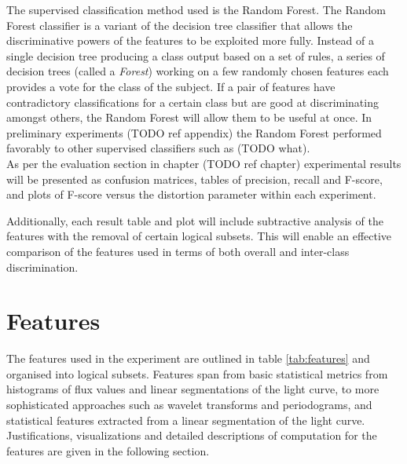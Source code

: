 		The supervised classification method used is the Random Forest. The Random Forest classifier is a variant of the decision tree classifier that allows the discriminative powers of the features to be exploited more fully. Instead of a single decision tree producing a class output based on a set of rules, a series of decision trees (called a \emph{Forest}) working on a few randomly chosen features each provides a vote for the class of the subject. If a pair of features have contradictory classifications for a certain class but are good at discriminating amongst others, the Random Forest will allow them to be useful at once. In preliminary experiments (TODO ref appendix) the Random Forest performed favorably to other supervised classifiers such as (TODO what).\\ %

	As per the evaluation section in chapter (TODO ref chapter) experimental results will be presented as confusion matrices, tables of precision, recall and F-score, and plots of F-score versus the distortion parameter within each experiment.
	
	Additionally, each result table and plot will include subtractive analysis of the features with the removal of certain logical subsets. This will enable an effective comparison of the features used in terms of both overall and inter-class discrimination.
	
	\section{Features}
	\label{sec:baselinefeatures}
	The features used in the experiment are outlined in table \ref{tab:features} and organised into logical subsets. Features span from basic statistical metrics from histograms of flux values and linear segmentations of the light curve, to more sophisticated approaches such as wavelet transforms and periodograms, and statistical features extracted from a linear segmentation of the light curve. Justifications, visualizations and detailed descriptions of computation for the features are given in the following section.
	

